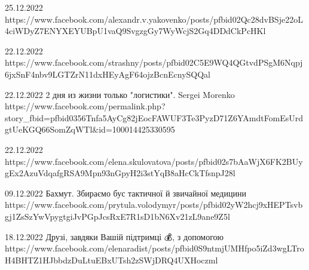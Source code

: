 25.12.2022
https://www.facebook.com/alexandr.v.yakovenko/posts/pfbid02Qc28dvBSje22oL4ciWDyZ7ENYXEYUBpU1vaQ9SvgzgGy7WyWcjS2Gq4DDdCkPcHKl

22.12.2022
https://www.facebook.com/strashny/posts/pfbid02C5E9WQ4QGtvdPSgM6Nqpj6jxSnF4nbv9LGTZrN11dxHEyAgF64ojzBcnEcnySQQal

22.12.2022
2 дня из жизни только "логистики".
Sergei Morenko
https://www.facebook.com/permalink.php?story_fbid=pfbid0356Tnfa5AyCg82jEocFAWUF3Te3PyzD71Z6YAmdtFomEsUrdgtUeKGQ66SomZqWTl&id=100014425330595

22.12.2022
https://www.facebook.com/elena.skulovatova/posts/pfbid02s7bAaWjX6FK2BUygEx2AzuVdqafgRSA9Mpn93nGpyH2i3stYqB8aHcCkTfsnpJ28l

09.12.2022
Бахмут. Збираємо бус тактичної й звичайної медицини
https://www.facebook.com/prytula.volodymyr/posts/pfbid02yW2hcj9xHEPTsvbgj1ZsSzYwVpygtgiJvPGpJcsRxE7R1sD1bN6Xv21zL9ane9Z5l

18.12.2022
Друзі, завдяки Вашій підтримці 💰, з  допомогою
https://www.facebook.com/elenaradist/posts/pfbid0S9ntmjUMHfpo5iZd3wgLTroH4BHTZ1HJbbdzDuLtuEBxUTsh2zSWjDRQ4UXHoczml
